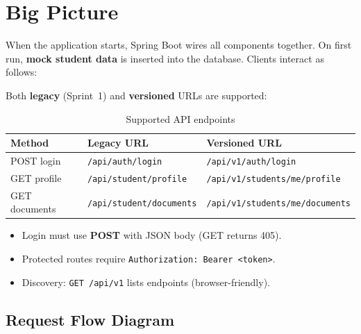 \documentclass[11pt,a4paper]{article}
\begin{document}
\section{Big Picture}

When the application starts, Spring Boot wires all components together. On first run, \textbf{mock student data} is inserted into the database. Clients interact as follows:

Both \textbf{legacy} (Sprint~1) and \textbf{versioned} URLs are supported:

\begin{table}[h]
\centering
\small
\begin{tabular}{@{}lll@{}}
\toprule
\textbf{Method} & \textbf{Legacy URL} & \textbf{Versioned URL} \\
\midrule
POST login & \texttt{/api/auth/login} & \texttt{/api/v1/auth/login} \\
GET profile & \texttt{/api/student/profile} & \texttt{/api/v1/students/me/profile} \\
GET documents & \texttt{/api/student/documents} & \texttt{/api/v1/students/me/documents} \\
\bottomrule
\end{tabular}
\caption{Supported API endpoints}
\end{table}

\begin{itemize}[noitemsep]
    \item Login must use \textbf{POST} with JSON body (GET returns 405).
    \item Protected routes require \texttt{Authorization: Bearer <token>}.
    \item Discovery: \texttt{GET /api/v1} lists endpoints (browser-friendly).
\end{itemize}

\subsection{Request Flow Diagram}
\end{document}
